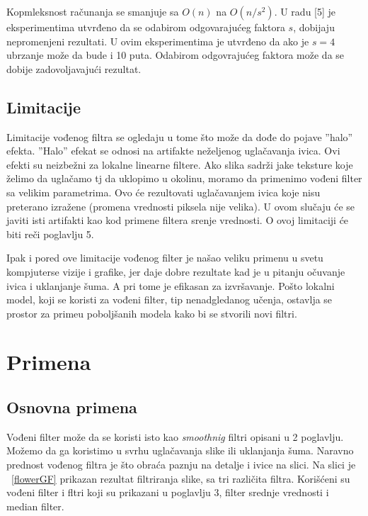 \documentclass[a4paper,12pt,titlepage]{article}
\begin{document}
Kopmleksnost računanja se smanjuje sa $O(n)$ na $O(n / s^2)$. U radu [5] je eksperimentima utvrđeno da se odabirom odgovarajućeg faktora $s$, dobijaju nepromenjeni rezultati. U ovim eksperimentima je utvrđeno da ako je $s = 4$ ubrzanje može da bude i 10 puta. Odabirom odgovrajućeg faktora može da se dobije zadovoljavajući rezultat.   

\subsection{Limitacije}%

Limitacije vođenog filtra se ogledaju u tome što može da dođe do pojave ''halo'' efekta. ''Halo'' efekat se odnosi na artifakte neželjenog uglačavanja ivica. Ovi efekti su neizbežni za lokalne linearne filtere. Ako slika sadrži jake teksture koje želimo da uglačamo tj da uklopimo u okolinu, moramo da primenimo vođeni filter sa velikim parametrima. Ovo će rezultovati uglačavanjem ivica koje nisu preterano izražene (promena vrednosti piksela nije velika). U ovom slučaju će se javiti isti artifakti kao kod primene filtera srenje vrednosti. O ovoj limitaciji će biti reči poglavlju 5.

Ipak i pored ove limitacije vođenog filter je našao veliku primenu u svetu kompjuterse vizije i grafike, jer daje dobre rezultate kad je u pitanju očuvanje ivica i uklanjanje šuma. A pri tome je efikasan za izvršavanje. Pošto lokalni model, koji se koristi za vođeni filter, tip nenadgledanog učenja, ostavlja se prostor za primeu poboljšanih modela kako bi se stvorili novi filtri.  

\section{Primena}%

\subsection{Osnovna primena}%

Vođeni filter može da se koristi isto kao \emph{smoothnig} filtri opisani u 2 poglavlju. Možemo da ga koristimo u svrhu uglačavanja slike ili uklanjanja šuma. Naravno prednost vođenog filtra je što obraća paznju na detalje i ivice na slici. Na slici je ~\ref{flowerGF} prikazan rezultat filtriranja slike, sa tri različita filtra. Korišćeni su vođeni filter i fltri koji su prikazani u poglavlju 3, filter srednje vrednosti i median filter. 
\end{document}
